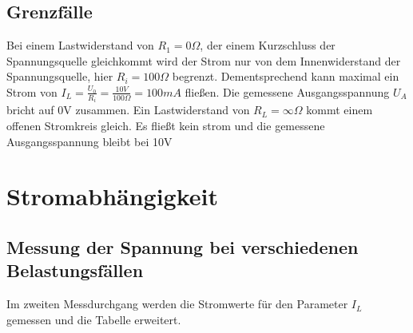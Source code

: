 \documentclass[
a4paper,     %
 headsepline, %
11pt         %
]{scrartcl}  %
\begin{document}
\subsection{Grenzfälle}

Bei einem Lastwiderstand von $R_1=0\Omega$, der einem Kurzschluss der Spannungsquelle gleichkommt wird der Strom nur von dem Innenwiderstand der Spannungsquelle, hier $R_i=100\Omega$ begrenzt. Dementsprechend kann maximal ein Strom von $I_L=\frac{U_0}{R_i}=\frac{10V}{100\Omega}=100mA$ fließen. Die gemessene Ausgangsspannung $U_A$ bricht auf 0V zusammen. Ein Lastwiderstand von $R_L=\infty \Omega$ kommt einem offenen Stromkreis gleich. Es fließt kein strom und die gemessene Ausgangsspannung bleibt bei 10V

\section{Stromabhängigkeit}
\subsection{Messung der Spannung bei verschiedenen Belastungsfällen}

Im zweiten Messdurchgang werden die Stromwerte für den Parameter $I_L$ gemessen und die Tabelle erweitert.
\end{document}
